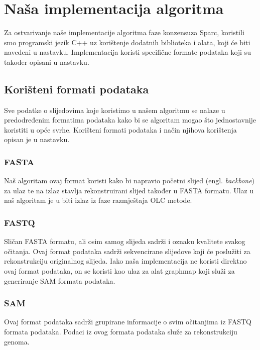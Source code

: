\documentclass[times, utf8, seminar, numeric]{fer}
\begin{document}

\chapter{Naša implementacija algoritma}
Za ostvarivanje naše implementacije algoritma faze konzensuza Sparc, koristili smo programski jezik C++ uz korištenje dodatnih biblioteka i alata, koji će biti navedeni u nastavku. Implementacija koristi specifične formate podataka koji su također opisani u nastavku.
\section{Korišteni formati podataka}
Sve podatke o slijedovima koje koristimo u našem algoritmu se nalaze u predodređenim formatima podataka kako bi se algoritam mogao što jednostavnije koristiti u opće svrhe. Korišteni formati podataka i način njihova korištenja opisan je u nastavku.
\subsection{FASTA}
Naš algoritam ovaj format koristi kako bi napravio početni slijed (engl. \emph{backbone}) za ulaz te na izlaz stavlja rekonstruirani slijed također u FASTA formatu.
Ulaz u naš algoritam je u biti izlaz iz faze razmještaja OLC metode.
\subsection{FASTQ}
Sličan FASTA formatu, ali osim samog slijeda sadrži i oznaku kvalitete svakog očitanja.
Ovaj format podataka sadrži sekvencirane slijedove koji će poslužiti za rekonstrukciju originalnog slijeda.
Iako naša implementacija ne koristi direktno ovaj format podataka, on se koristi kao ulaz za alat graphmap koji služi za generiranje SAM formata podataka.
\subsection{SAM}
Ovaj format podataka sadrži grupirane informacije o svim očitanjima iz FASTQ formata podataka. Podaci iz ovog formata podataka služe za rekonstrukciju genoma. 
\end{document}
